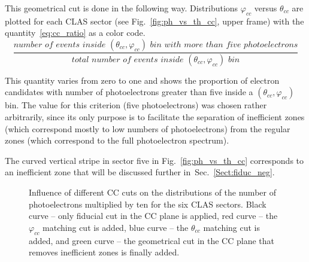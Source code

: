 This geometrical cut is done in the following way. Distributions $\varphi_{cc}$ versus $\theta_{cc}$ are plotted for each CLAS sector (see Fig.~\ref{fig:ph_vs_th_cc}, upper frame) with the quantity~\eqref{eq:cc_ratio} as a color code. 
\begin{equation}
\frac{number\,\, of\,\, events\,\,  inside\,\, (\theta_{cc},\varphi_{cc})\,\, bin\,\, with\,\, more\,\, than\,\, five\,\, photoelectrons }{total\,\, number\,\, of\,\, events\,\,  inside\,\, (\theta_{cc},\varphi_{cc})\,\, bin}
\label{eq:cc_ratio}
\end{equation}%

This quantity varies from zero to one and shows the proportion of electron candidates with number of photoelectrons greater than five inside a $(\theta_{cc},\varphi_{cc})$ bin. The value for this criterion (five photoelectrons) was chosen rather arbitrarily, since its only purpose is to facilitate the separation of inefficient zones (which correspond mostly to low numbers of photoelectrons) from the regular zones (which correspond to the full photoelectron spectrum). 

The curved vertical stripe in sector five in Fig.~\ref{fig:ph_vs_th_cc} corresponds to an inefficient zone that will be discussed further in~Sec.~\ref{Sect:fiduc_neg}.

\begin{figure}[htp]
\begin{center}
\caption{\small Influence of different CC cuts on the distributions of the number of photoelectrons multiplied by ten for the six CLAS sectors. Black curve -- only fiducial cut in the CC plane is applied, red curve -- the $\varphi_{cc}$ matching cut is added, blue curve -- the $\theta_{cc}$ matching cut is added, and green curve -- the geometrical cut in the CC plane that removes inefficient zones is finally added.} \label{fig:nphe_all_seg}
\end{center}
\end{figure}


